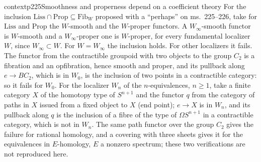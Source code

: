 \begin{dcomment}{context}{p225}{Smoothness and properness depend on a coefficient theory}
For the inclusion $\mathrm{Liss}\cap\mathrm{Prop}\subseteq\mathrm{Fib}_W$ proposed with a ``perhaps'' on ms.~225--226, take for $\mathrm{Liss}$ and $\mathrm{Prop}$ the $W$-smooth and the $W$-proper functors. A $W_\infty$-smooth functor is $W$-smooth and a $W_\infty$-proper one is $W$-proper, for every fundamental localizer $W$, since $W_\infty\subset W$. For $W=W_\infty$ the inclusion holds. For other localizers it fails. The functor from the contractible groupoid with two objects to the group $C_2$ is a fibration and an opfibration, hence smooth and proper, and its pullback along $e\to BC_2$, which is in $W_0$, is the inclusion of two points in a contractible category: so it fails for $W_0$. For the localizer $W_n$ of the $n$-equivalences, $n\geq1$, take a finite category $X$ of the homotopy type of $S^{n+1}$ and the functor $q$ from the category of paths in $X$ issued from a fixed object to $X$ (end point); $e\to X$ is in $W_n$, and its pullback along $q$ is the inclusion of a fibre of the type of $\Omega S^{n+1}$ in a contractible category, which is not in $W_n$. The same path functor over the group $C_2$ gives the failure for rational homology, and a covering with three sheets gives it for the equivalences in $E$-homology, $E$ a nonzero spectrum; these two verifications are not reproduced here.
\end{dcomment}

